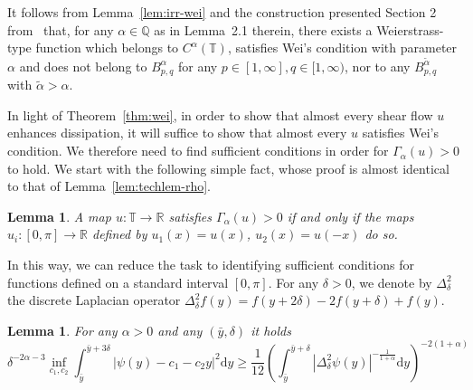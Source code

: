 \documentclass[11pt,oneside,reqno]{amsart}
\newcommand{\mathd}{\mathrm{d}}
\newtheorem{lemma}[theorem]{Lemma}
\numberwithin{equation}{section}
\begin{document}
\begin{remark}
  It follows from Lemma~\ref{lem:irr-wei} and the construction presented
  Section 2 from~{\cite{colombozelati}} that, for any $\alpha \in \mathbb{Q}$
  as in Lemma~2.1 therein, there exists a Weierstrass-type function which
  belongs to $C^{\alpha} (\mathbb{T})$, satisfies Wei's condition with
  parameter $\alpha$ and does not belong to $B^{\alpha}_{p, q}$ for any $p \in
  [1, \infty], q \in [1, \infty)$, nor to any $B^{\tilde{\alpha}}_{p, q}$ with
  $\tilde{\alpha} > \alpha$.
\end{remark}

In light of Theorem~\ref{thm:wei}, in order to show that almost every shear
flow $u$ enhances dissipation, it will suffice to show that almost every $u$
satisfies Wei's condition. We therefore need to find sufficient conditions in
order for $\Gamma_{\alpha} (u) > 0$ to hold. We start with the following
simple fact, whose proof is almost identical to that of
Lemma~\ref{lem:techlem-rho}.

\begin{lemma}
  A map $u : \mathbb{T} \rightarrow \mathbb{R}$ satisfies $\Gamma_{\alpha} (u)
  > 0$ if and only if the maps $u_i : [0, \pi] \rightarrow \mathbb{R}$ defined
  by $u_1 (x) = u (x)$, $u_2 (x) = u (- x)$ do so.
\end{lemma}

In this way, we can reduce the task to identifying sufficient conditions for
functions defined on a standard interval $[0, \pi]$. For any $\delta > 0$, we
denote by $\Delta^2_{\delta}$ the discrete Laplacian operator
$\Delta^2_{\delta} f (y) = f (y + 2 \delta) - 2 f (y + \delta) + f (y)$.

\begin{lemma}
  \label{lem:wei-techlem-1}For any $\alpha > 0$ and any $(\bar{y}, \delta)$ it
  holds
  \begin{equation}
      \delta^{- 2 \alpha - 3} \inf_{c_1, c_2} \int_{\bar{y}}^{\bar{y} + 3
      \delta} | \psi (y) - c_1 - c_2 y |^2 \mathd y
       \geqslant \frac{1}{12}  \left( \int_{\bar{y}}^{\bar{y} +
      \delta} | \Delta_{\delta}^2 \psi (y) |^{- \frac{1}{1 + \alpha}} \mathd y
      \right)^{- 2 (1 + \alpha)} \label{eq:wei-basic-ineq}
  \end{equation}
  
\end{lemma}
\end{document}
